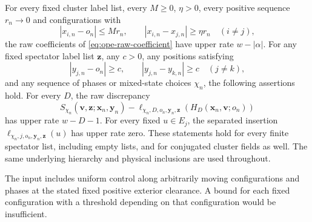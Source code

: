 \begin{assumption}\label{input:ope-raw-estimates}
For every fixed cluster label list, every $M\geq0$, $\eta>0$, every
positive sequence $r_n\to0$ and configurations with
\[
 |x_{i,n}-o_n|\leq Mr_n,\qquad
 |x_{i,n}-x_{j,n}|\geq\eta r_n\quad(i\neq j),
\]
the raw coefficients of \eqref{eq:ope-raw-coefficient} have upper rate
$w-|\alpha|$. For any fixed spectator label list $\boldsymbol z$,
any $c>0$, any positions satisfying
\[
 |y_{j,n}-o_n|\geq c,\qquad |y_{j,n}-y_{k,n}|\geq c\quad(j\neq k),
\]
and any sequence of phases or mixed-state choices $\chi_n$, the following
assertions hold.
For every $D$, the raw discrepancy
\begin{equation}\label{eq:ope-raw-discrepancy}
 S_{\chi_n}(\boldsymbol v,\boldsymbol z;\boldsymbol x_n,\boldsymbol y_n)
 -\ell_{\chi_n,D,o_n,\boldsymbol y_n,\boldsymbol z}
                 (H_D(\boldsymbol x_n,\boldsymbol v;o_n))
\end{equation}
has upper rate $w-D-1$. For every fixed $u\in E_j$, the separated
insertion $\ell_{\chi_n,j,o_n,\boldsymbol y_n,\boldsymbol z}(u)$ has
upper rate zero. These statements hold for every finite spectator list,
including empty lists, and for conjugated cluster fields as well.
The same underlying hierarchy and physical inclusions are used throughout.
\end{assumption}
The input includes uniform control along arbitrarily moving configurations
and phases at the stated fixed positive exterior clearance. A bound for each
fixed configuration with a threshold depending on that configuration
would be insufficient.

